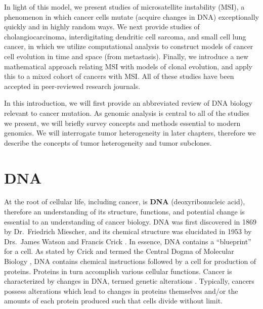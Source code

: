 In light of this model, we present studies of microsatellite instability (MSI), a phenomenon in which cancer cells mutate (acquire changes in DNA) exceptionally quickly and in highly random ways. We next provide studies of cholangiocarcinoma, interdigitating dendritic cell sarcoma, and small cell lung cancer, in which we utilize computational analysis to construct models of cancer cell evolution in time and space (from metastasis). Finally, we introduce a new mathematical approach relating MSI with models of clonal evolution, and apply this to a mixed cohort of cancers with MSI\@. All of these studies have been accepted in peer-reviewed research journals.

In this introduction, we will first provide an abbreviated review of DNA biology relevant to cancer mutation. As genomic analysis is central to all of the studies we present, we will briefly survey concepts and methods essential to modern genomics. We will interrogate tumor heterogeneity in later chapters, therefore we describe the concepts of tumor heterogeneity and tumor subclones.

\section{DNA}
At the root of cellular life, including cancer, is \textbf{DNA} (deoxyribonucleic acid), therefore an understanding of its structure, functions, and potential change is essential to an understanding of cancer biology. DNA was first discovered in 1869 by Dr.\ Friedrich Miescher, and its chemical structure was elucidated in 1953 by Drs.\ James Watson and Francis Crick \cite{pray2008}. In essence, DNA contains a ``blueprint'' for a cell. As stated by Crick and termed the Central Dogma of Molecular Biology \cite{crick1970}, DNA contains chemical instructions followed by a cell for production of proteins. Proteins in turn accomplish various cellular functions. Cancer is characterized by changes in DNA, termed genetic alterations \cite{tabin1982,reddy1982}. Typically, cancers possess alterations which lead to changes in proteins themselves and/or the amounts of each protein produced such that cells divide without limit.

